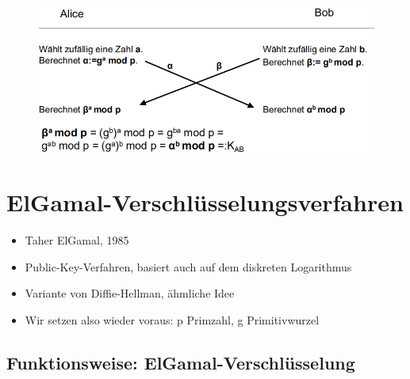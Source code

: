 \documentclass[openany]{book}
\begin{document}
\begin{figure}[h!]
    \centering
    \includegraphics[width=\linewidth]{Pics/DiffieHellman.PNG}
\end{figure} 

\section{ElGamal-Verschlüsselungsverfahren}

\begin{itemize}
    \item Taher ElGamal, 1985
    \item Public-Key-Verfahren, basiert auch auf dem diskreten Logarithmus
    \item Variante von Diffie-Hellman, ähmliche Idee
    \item Wir setzen also wieder voraus: p Primzahl, g Primitivwurzel
\end{itemize}

\subsection{Funktionsweise: ElGamal-Verschlüsselung}
\end{document}
